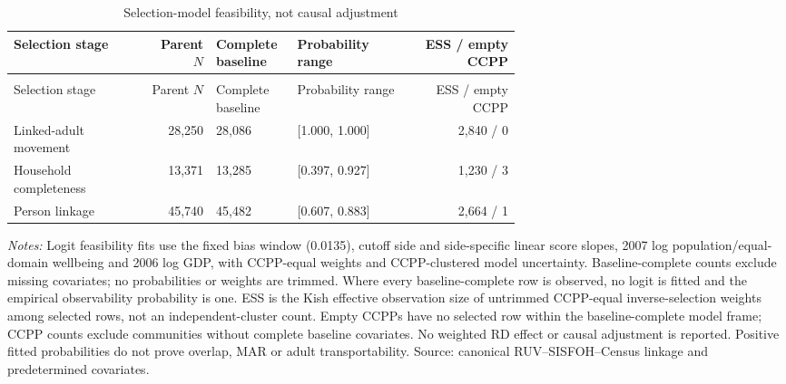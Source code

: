 \begingroup\fontsize{9.25}{11.4}\selectfont
\setlength{\tabcolsep}{3pt}\renewcommand{\arraystretch}{1.18}
\begin{longtable}{@{}>{\raggedright\arraybackslash}p{0.27\linewidth}rp{0.16\linewidth}p{0.22\linewidth}r@{}}
\caption{Selection-model feasibility, not causal adjustment}\label{tab:pub_A24} \\
\toprule Selection stage & Parent \(N\) & Complete baseline & Probability range & ESS / empty CCPP \\ \midrule\endfirsthead
\multicolumn{5}{c}{\tablename\ \thetable{} -- continued} \\
\toprule Selection stage & Parent \(N\) & Complete baseline & Probability range & ESS / empty CCPP \\ \midrule\endhead
Linked-adult movement & 28,250 & 28,086 & [1.000, 1.000] & 2,840 / 0 \\
Household completeness & 13,371 & 13,285 & [0.397, 0.927] & 1,230 / 3 \\
Person linkage & 45,740 & 45,482 & [0.607, 0.883] & 2,664 / 1 \\
\bottomrule\end{longtable}
\parbox{0.98\linewidth}{\footnotesize\textit{Notes:} Logit feasibility fits use the fixed bias window (0.0135), cutoff side and side-specific linear score slopes, 2007 log population/equal-domain wellbeing and 2006 log GDP, with CCPP-equal weights and CCPP-clustered model uncertainty. Baseline-complete counts exclude missing covariates; no probabilities or weights are trimmed. Where every baseline-complete row is observed, no logit is fitted and the empirical observability probability is one. ESS is the Kish effective observation size of untrimmed CCPP-equal inverse-selection weights among selected rows, not an independent-cluster count. Empty CCPPs have no selected row within the baseline-complete model frame; CCPP counts exclude communities without complete baseline covariates. No weighted RD effect or causal adjustment is reported. Positive fitted probabilities do not prove overlap, MAR or adult transportability. Source: canonical RUV--SISFOH--Census linkage and predetermined covariates.}
\par{}\par\endgroup
